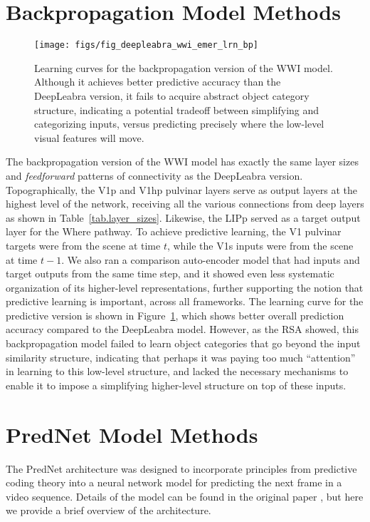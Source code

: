 \section{Backpropagation Model Methods}

\begin{figure}
  \centering\texttt{[image: figs/fig\_deepleabra\_wwi\_emer\_lrn\_bp]}
  \caption{\footnotesize Learning curves for the backpropagation version of the WWI model.  Although it achieves better predictive accuracy than the DeepLeabra version, it fails to acquire abstract object category structure, indicating a potential tradeoff between simplifying and categorizing inputs, versus predicting precisely where the low-level visual features will move.}
  \label{fig.bp_lrn}
\end{figure}

The backpropagation version of the WWI model has exactly the same layer sizes and {\em feedforward} patterns of connectivity as the DeepLeabra version.  Topographically, the V1p and V1hp pulvinar layers serve as output layers at the highest level of the network, receiving all the various connections from deep layers as shown in Table~\ref{tab.layer_sizes}.  Likewise, the LIPp served as a target output layer for the Where pathway.  To achieve predictive learning, the V1 pulvinar targets were from the scene at time $t$, while the V1s inputs were from the scene at time $t-1$.  We also ran a comparison auto-encoder model that had inputs and target outputs from the same time step, and it showed even less systematic organization of its higher-level representations, further supporting the notion that predictive learning is important, across all frameworks.  The learning curve for the predictive version is shown in Figure~\ref{fig.bp_lrn}, which shows better overall prediction accuracy compared to the DeepLeabra model.  However, as the RSA showed, this backpropagation model failed to learn object categories that go beyond the input similarity structure, indicating that perhaps it was paying too much ``attention'' in learning to this low-level structure, and lacked the necessary mechanisms to enable it to impose a simplifying higher-level structure on top of these inputs.

\section{PredNet Model Methods}

The PredNet architecture was designed to incorporate principles from predictive coding theory into a neural network model for predicting the next frame in a video sequence. Details of the model can be found in the original paper \citep{LotterKreimanCox16}, but here we provide a brief overview of the architecture. 

